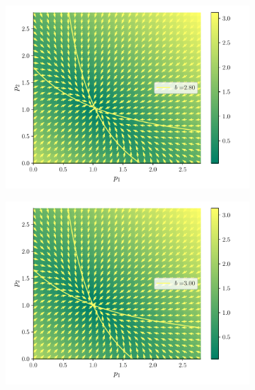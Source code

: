 \documentclass[twocolumn,aps,prl]{revtex4-1}
\begin{document}
\begin{figure}[ht!]
  \begin{subfigure}[b]{0.49\linewidth}
      \centering
      \includegraphics[width = 0.999\textwidth]{figuras/ex02-cosa3-2.pdf}
  \end{subfigure}\quad
  \begin{subfigure}[b]{0.49\linewidth}
      \centering
      \includegraphics[width = 0.999\textwidth]{figuras/ex02-cosa3-3.pdf}
  \end{subfigure}\quad
  \begin{subfigure}[b]{0.49\linewidth}
      \centering

\end{subfigure}
\end{figure}
\end{document}
